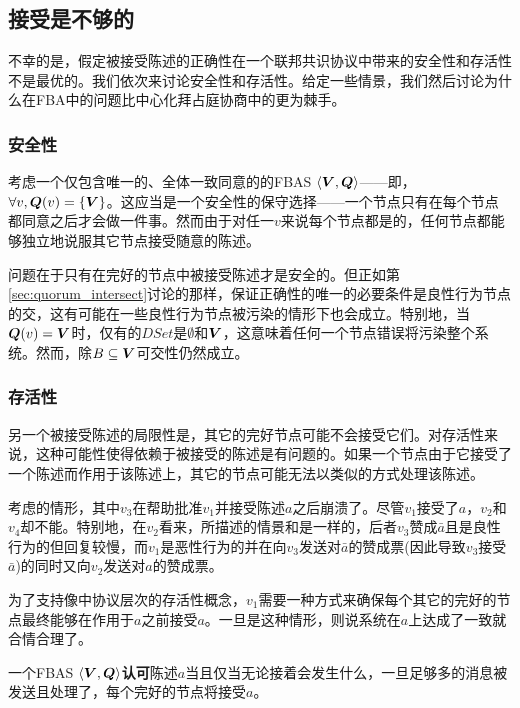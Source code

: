 \subsection{接受是不够的}
不幸的是，假定被接受陈述的正确性在一个联邦共识协议中带来的安全性和存活性不是最优的。我们依次来讨论安全性和存活性。给定一些情景，我们然后讨论为什么在FBA中的问题比中心化拜占庭协商中的更为棘手。

\subsubsection{安全性}\label{sec:voting_safety}
考虑一个仅包含唯一的、全体一致同意的{\quorum}的FBAS $\langle{\bm V},{\bm Q}\rangle$——即，$\forall v, {\bm Q}(v)=\left\{{\bm V}\right\}$。这应当是一个安全性的保守选择——一个节点只有在每个节点都同意之后才会做一件事。然而由于对任一$v$来说每个节点都是{\vblock}的，任何节点都能够独立地说服其它节点接受随意的陈述。

问题在于只有在完好的节点中被接受陈述才是安全的。但正如第\ref{sec:quorum_intersect}讨论的那样，保证正确性的唯一的必要条件是良性行为节点的{\quorum}交，这有可能在一些良性行为节点被污染的情形下也会成立。特别地，当${\bm Q}(v)={\bm V}$时，仅有的$DSet$是$\emptyset$和${\bm V}$，这意味着任何一个节点错误将污染整个系统。然而，除$B\subseteq{\bm V}${\quorum}可交性仍然成立。

\subsubsection{存活性}\label{sec:accept_not_enough_liveness}
另一个被接受陈述的局限性是，其它的完好节点可能不会接受它们。对存活性来说，这种可能性使得依赖于被接受的陈述是有问题的。如果一个节点由于它接受了一个陈述而作用于该陈述上，其它的节点可能无法以类似的方式处理该陈述。

考虑的情形，其中$v_3$在帮助批准$v_1$并接受陈述$a$之后崩溃了。尽管$v_1$接受了$a$，$v_2$和$v_4$却不能。特别地，在$v_2$看来，所描述的情景和是一样的，后者$v_3$赞成$\bar a$且是良性行为的但回复较慢，而$v_1$是恶性行为的并在向$v_3$发送对$\bar a$的赞成票(因此导致$v_3$接受$\bar a$)的同时又向$v_2$发送对$a$的赞成票。

为了支持像中协议层次的存活性概念，$v_1$需要一种方式来确保每个其它的完好的节点最终能够在作用于$a$之前接受$a$。一旦是这种情形，则说系统在$a$上达成了一致就合情合理了。

\begin{definition}[认可]\label{def:agree}
	一个FBAS $\langle{\bm V},{\bm Q}\rangle$\textbf{认可}陈述$a$当且仅当无论接着会发生什么，一旦足够多的消息被发送且处理了，每个完好的节点将接受$a$。
\end{definition}

